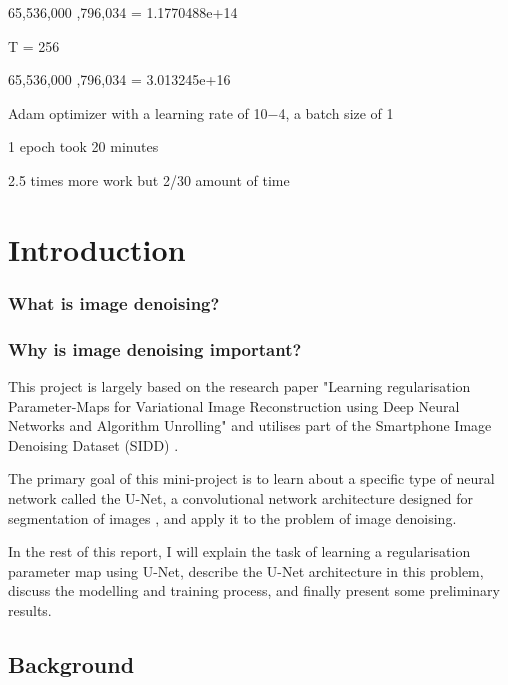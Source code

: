 \documentclass[12pt]{article}
\begin{document}
65,536,000  ,796,034  =  1.1770488e+14

T = 256

65,536,000  ,796,034    =  3.013245e+16


Adam optimizer with a learning rate of 10−4, a batch size of 1

1 epoch took 20 minutes


2.5 times more work  but  2/30  amount of time


\section{Introduction}


\subsubsection{What is image denoising?}

\subsubsection{Why is image denoising important?}


This project is largely based on the research paper "Learning regularisation Parameter-Maps for Variational Image Reconstruction using Deep Neural Networks and Algorithm Unrolling" \cite{kofler2023learning} and utilises part of the Smartphone Image Denoising Dataset (SIDD) \cite{SIDD_2018_CVPR}.

 

The primary goal of this mini-project is to learn about a specific type of neural network called the U-Net, a convolutional network architecture
designed for segmentation of images \cite{ronneberger2015unet}, and apply it to the problem of image denoising. 

In the rest of this report, I will explain the task of learning a regularisation parameter map using U-Net, describe the U-Net architecture in this problem, discuss the modelling and training process, and finally present some preliminary results. 



\subsection{Background}
\end{document}
